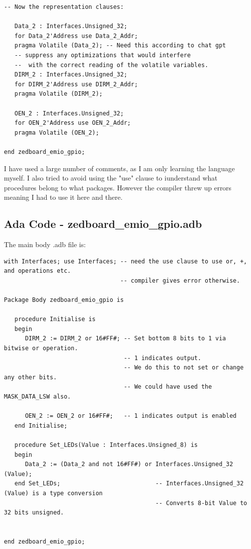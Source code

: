 \begin{lstlisting}[style=ada]
   -- Now the representation clauses:

   Data_2 : Interfaces.Unsigned_32;
   for Data_2'Address use Data_2_Addr;
   pragma Volatile (Data_2); -- Need this according to chat gpt
   -- suppress any optimizations that would interfere
   --  with the correct reading of the volatile variables.
   DIRM_2 : Interfaces.Unsigned_32;
   for DIRM_2'Address use DIRM_2_Addr;
   pragma Volatile (DIRM_2);

   OEN_2 : Interfaces.Unsigned_32;
   for OEN_2'Address use OEN_2_Addr;
   pragma Volatile (OEN_2);

end zedboard_emio_gpio;

\end{lstlisting}

I have used a large number of comments, as I am only learning the language myself. I also tried to avoid using the "use" clause to iunderstand what procedures belong to what packages. However the compiler threw up errors meaning I had to use it here and there.

\subsection{Ada Code - zedboard\_emio\_gpio.adb}

The main body .adb file is:

\begin{lstlisting}[style=ada]
with Interfaces; use Interfaces; -- need the use clause to use or, +, and operations etc.
                                 -- compiler gives error otherwise.

Package Body zedboard_emio_gpio is

   procedure Initialise is
   begin
      DIRM_2 := DIRM_2 or 16#FF#; -- Set bottom 8 bits to 1 via bitwise or operation.
                                  -- 1 indicates output.
                                  -- We do this to not set or change any other bits.
                                  -- We could have used the MASK_DATA_LSW also.
      
      OEN_2 := OEN_2 or 16#FF#;   -- 1 indicates output is enabled
   end Initialise;

   procedure Set_LEDs(Value : Interfaces.Unsigned_8) is
   begin
      Data_2 := (Data_2 and not 16#FF#) or Interfaces.Unsigned_32 (Value);
   end Set_LEDs;                           -- Interfaces.Unsigned_32 (Value) is a type conversion
                                           -- Converts 8-bit Value to 32 bits unsigned.


end zedboard_emio_gpio;
\end{lstlisting}


